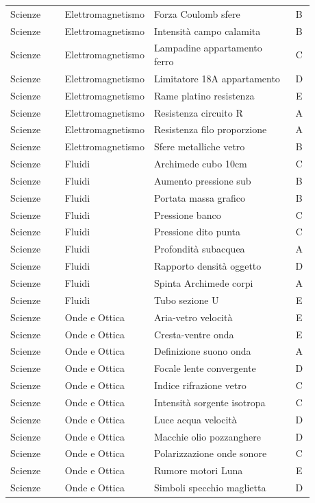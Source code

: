\documentclass[20pt, a4paper]{article}
\begin{document}
\begin{longtable}{@{}>{\raggedright\arraybackslash}p{0.18\linewidth}>{\raggedright\arraybackslash}p{0.24\linewidth}>{\raggedright\arraybackslash}p{0.46\linewidth}c@{}}
Scienze & Elettromagnetismo & Forza Coulomb sfere & B \\
Scienze & Elettromagnetismo & Intensità campo calamita & B \\
Scienze & Elettromagnetismo & Lampadine appartamento ferro & C \\
Scienze & Elettromagnetismo & Limitatore 18A appartamento & D \\
Scienze & Elettromagnetismo & Rame platino resistenza & E \\
Scienze & Elettromagnetismo & Resistenza circuito R & A \\
Scienze & Elettromagnetismo & Resistenza filo proporzione & A \\
Scienze & Elettromagnetismo & Sfere metalliche vetro & B \\
Scienze & Fluidi & Archimede cubo 10cm & C \\
Scienze & Fluidi & Aumento pressione sub & B \\
Scienze & Fluidi & Portata massa grafico & B \\
Scienze & Fluidi & Pressione banco & C \\
Scienze & Fluidi & Pressione dito punta & C \\
Scienze & Fluidi & Profondità subacquea & A \\
Scienze & Fluidi & Rapporto densità oggetto & D \\
Scienze & Fluidi & Spinta Archimede corpi & A \\
Scienze & Fluidi & Tubo sezione U & E \\
Scienze & Onde e Ottica & Aria-vetro velocità & E \\
Scienze & Onde e Ottica & Cresta-ventre onda & E \\
Scienze & Onde e Ottica & Definizione suono onda & A \\
Scienze & Onde e Ottica & Focale lente convergente & D \\
Scienze & Onde e Ottica & Indice rifrazione vetro & C \\
Scienze & Onde e Ottica & Intensità sorgente isotropa & C \\
Scienze & Onde e Ottica & Luce acqua velocità & D \\
Scienze & Onde e Ottica & Macchie olio pozzanghere & D \\
Scienze & Onde e Ottica & Polarizzazione onde sonore & C \\
Scienze & Onde e Ottica & Rumore motori Luna & E \\
Scienze & Onde e Ottica & Simboli specchio maglietta & D \\

\end{longtable}
\end{document}
